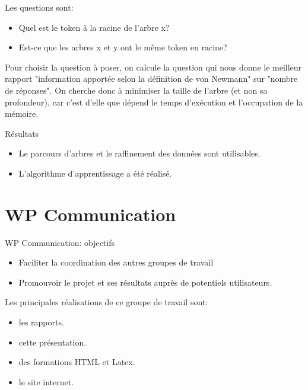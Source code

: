 \documentclass[slidetop]{beamer}
\begin{document}
\begin{frame}

Les questions sont:
\begin{itemize}
    \item Quel est le token à la racine de l'arbre x?
    \item Est-ce que les arbres x et y ont le même token en racine?
\end{itemize}


Pour choisir la question à poser, 
on calcule la question qui nous donne le meilleur rapport "information apportée selon la définition de von Newmann" sur "nombre de réponses". 
On cherche donc à minimiser la taille de l'arbre (et non sa profondeur),
car c'est d'elle que dépend le temps d'exécution et l'occupation de la mémoire.
\end{frame}
\begin{frame}

Résultats
\begin{itemize}
    \item Le parcours d'arbres et le raffinement des données sont utilisables.
    \item L'algorithme d'apprentissage a été réalisé.
\end{itemize}




\end{frame}


\section{WP Communication}


\begin{frame}

WP Communication: objectifs
\begin{itemize}
    \item Faciliter la coordination des autres groupes de travail %
    \item Promouvoir le projet et ses résultats auprès de potentiels utilisateurs. %
\end{itemize}


\end{frame}


\begin{frame}

Les principales réalisations de ce groupe de travail sont:
\begin{itemize}
 
    \item les rapports. %
    \item cette présentation.
    \item des formations HTML et Latex. %
    \item le site internet. %

\end{itemize}
\end{frame}
\end{document}
